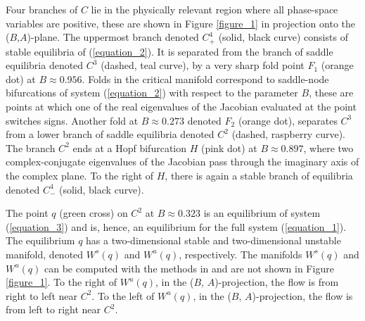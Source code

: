 \documentclass{ws-ijbc}
\begin{document}
Four branches of $C$ lie in the physically relevant region where all phase-space variables are positive, these are shown in Figure \ref{figure_1} in projection onto the ($B$,$A$)-plane.  The uppermost branch denoted $C^4_+$ (solid, black curve) consists of stable equilibria of (\ref{equation_2}).  It is separated from the branch of saddle equilibria denoted $C^3$ (dashed, teal curve), by a very sharp fold point $F_1$ (orange dot) at $B \approx 0.956$.  Folds in the critical manifold correspond to saddle-node bifurcations of system (\ref{equation_2}) with respect to the parameter $B$, these are points at which one of the real eigenvalues of the Jacobian evaluated at the point switches signs.  Another fold at $B \approx 0.273$ denoted $F_2$ (orange dot), separates $C^3$ from a lower branch of saddle equilibria denoted $C^2$ (dashed, raspberry curve).   The branch $C^2$ ends at a Hopf bifurcation $H$ (pink dot) at $B \approx 0.897$, where two complex-conjugate eigenvalues of the Jacobian pass through the imaginary axis of the complex plane.  To the right of $H$, there is again a stable branch of equilibria denoted $C^4_-$ (solid, black curve).

The point $q$ (green cross) on $C^2$ at $B \approx 0.323$ is an equilibrium of system (\ref{equation_3}) and is, hence, an equilibrium for the full system (\ref{equation_1}).  The equilibrium $q$ has a two-dimensional stable and two-dimensional unstable manifold, denoted $W^s(q)$ and $W^u(q)$, respectively.  The manifolds $W^{s}(q)$ and $W^{u}(q)$ can be computed with the methods in \cite{Red_book} and are not shown in Figure \ref{figure_1}.  To the right of $W^u(q)$, in the ($B$, $A$)-projection, the flow is from right to left near $C^2$.  To the left of $W^u(q)$, in the ($B$, $A$)-projection, the flow is from left to right near $C^2$.
\end{document}
